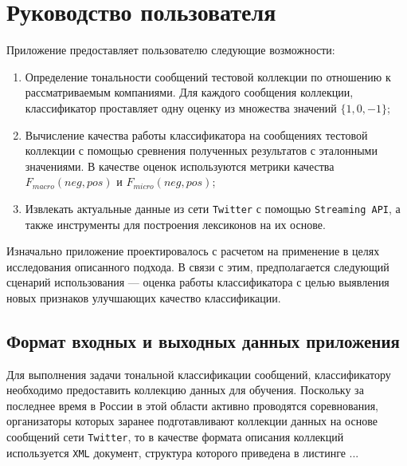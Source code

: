 \section{Руководство пользователя}
Приложение предоставляет пользователю следующие возможности:
\begin{enumerate}
    \item Определение тональности сообщений тестовой коллекции по отношению к
    рассматриваемым компаниями. Для каждого сообщения коллекции, классификатор
    проставляет одну оценку из множества значений $\{1, 0, -1\}$;
    \item Вычисление качества работы классификатора на сообщениях тестовой
    коллекции с помощью сревнения полученных результатов с эталонными значениями.
    В качестве оценок используются метрики качества $F_{macro}(neg, pos)$ и
    $F_{micro}(neg, pos)$;
    \item Извлекать актуальные данные из сети {\tt Twitter} с помощью
    {\tt Streaming API}, а также инструменты для построения лексиконов на их
    основе.
\end{enumerate}
Изначально приложение проектировалось с расчетом на применение в целях
исследования описанного подхода. В связи с этим, предполагается следующий
сценарий использования --- оценка работы классификатора с целью выявления новых
признаков улучшающих качество классификации.
    \subsection{Формат входных и выходных данных приложения}
    Для выполнения задачи тональной классификации сообщений, классификатору
    необходимо предоставить коллекцию данных для обучения. Поскольку за последнее
    время в России в этой области активно проводятся соревнования, организаторы
    которых заранее подготавливают коллекции данных на основе сообщений сети
    {\tt Twitter}, то в качестве формата описания коллекций
    используется {\tt XML} документ, структура которого приведена в листинге ...

